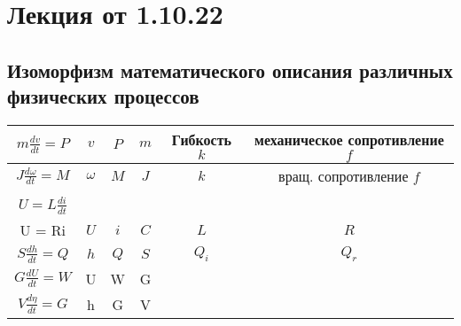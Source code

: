 \section{Лекция от 1.10.22}
\subsection{Изоморфизм математического описания различных физических процессов}
\begin{table}[h]
	\centering
	\begin{tabular}{|c|c|c|c|c|c|}
		\hline
		$m\frac{dv}{dt}=P$ & $v$ & $P$ & $m$ & Гибкость $k$ & механическое
		сопротивление $f$\\
		\hline
		$J\frac{d\omega}{dt} = M$ & $\omega$ & $M$ & $J$ & $k$ & вращ. сопротивление
		$f$\\
		\hline
		\makecell{$i = C\frac{dU}{dt}$\\ $U = L\frac{di}{dt}$\\ U = Ri} & $U$ & $i$ 
			& $C$ & $L$ & $R$\\
		\hline
		$S\frac{dh}{dt}=Q$ & $h$ & $Q$ & $S$ & $Q_i$ & $Q_r$\\
		\hline
		$G\frac{dU}{dt} = W$  & U & W & G &\, &\, \\ 
		\hline
		$V\frac{d\eta}{dt} = G$ & h & G & V & \, & \,\\
		\hline
	\end{tabular}
\end{table}

